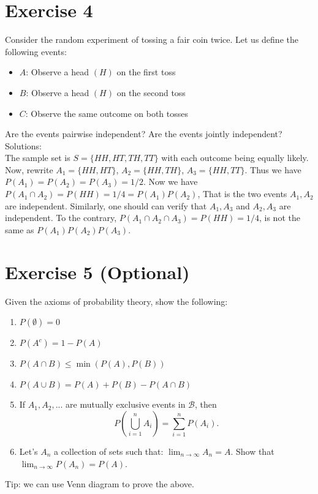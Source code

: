 \documentclass[12pt,thmsa]{article}
\begin{document}
\section*{Exercise 4}
Consider the random experiment of tossing a fair coin twice. Let us define the following events:
\begin{itemize}
\item $ A $: Observe a head $ (H) $ on the first toss
\item $ B $: Observe a head $ (H) $ on the second toss
\item $ C $: Observe the same outcome on both tosses
\end{itemize}
Are the events pairwise independent? Are the events jointly independent?\\
\noindent Solutions:\\
The sample set is $ S=\{HH, HT, TH, TT\} $ with each outcome being equally likely. Now, rewrite $ A_{1}=\{HH, HT\} $, $ A_{2}=\{HH, TH\} $, $ A_{3}=\{HH, TT\} $. Thus we have $ P(A_{1})=P(A_{2})=P(A_{3})=1/2 $. Now we have $ P(A_{1} \cap A_{2})=P(HH)=1/4=P(A_{1})P(A_{2}) $, That is the two events $ A_{1}, A_{2} $ are independent. Similarly, one should can verify that $ A_{1}, A_{3} $ and $ A_{2}, A_{3} $ are independent. To the contrary, $ P(A_{1}\cap A_{2} \cap A_{3})=P(HH)=1/4 $, is not the same as $ P(A_{1})P(A_{2})P(A_{3}) $.



\section*{Exercise 5 (Optional)}


Given the axioms of probability theory, show the following:
\begin{enumerate}
  \item $P(\emptyset)=0$
  \item $P(A^c)=1-P(A)$
  \item $P(A \cap B) \leq \min(P(A),P(B))$
  \item $P(A \cup B)=P(A)+P(B)-P(A \cap B)$
  \item If $A_1, A_2,...$ are mutually exclusive events in $\mathcal{B}$, then
\begin{equation}
P\left(  \bigcup_{i=1}^{n} A_i \right) = \sum_{i=1}^{n} P(A_i).  \label{Eq: ProbUnionDisj}
\end{equation}
  \item Let's $A_n$ a collection of sets such that: $\lim_{n\rightarrow \infty}A_n= A$.
  Show that $\lim_{n\rightarrow \infty}P(A_n)=P(A)$.
\end{enumerate}

Tip: we can use Venn diagram to prove the above.
\end{document}
